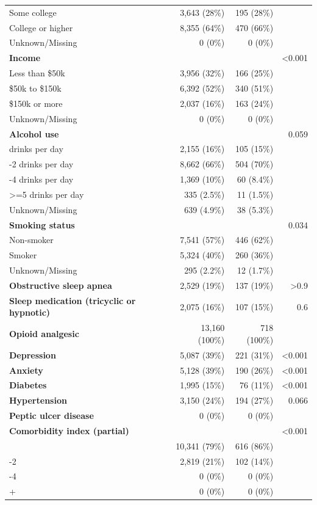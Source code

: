 \documentclass[11pt]{article}
\begin{document}
\begin{longtable}{@{}p{6.4cm}rrr@{}}
\quad Some college & 3,643 (28\%) & 195 (28\%) &  \\
\quad College or higher & 8,355 (64\%) & 470 (66\%) &  \\
\quad Unknown/Missing & 0 (0\%) & 0 (0\%) &  \\
\textbf{Income} &  &  & <0.001 \\
\quad Less than \$50k & 3,956 (32\%) & 166 (25\%) &  \\
\quad \$50k to \$150k & 6,392 (52\%) & 340 (51\%) &  \\
\quad \$150k or more & 2,037 (16\%) & 163 (24\%) &  \\
\quad Unknown/Missing & 0 (0\%) & 0 (0\%) &  \\
\textbf{Alcohol use} &  &  & 0.059 \\
\quad 0 drinks per day & 2,155 (16\%) & 105 (15\%) &  \\
\quad 1-2 drinks per day & 8,662 (66\%) & 504 (70\%) &  \\
\quad 3-4 drinks per day & 1,369 (10\%) & 60 (8.4\%) &  \\
\quad >=5 drinks per day & 335 (2.5\%) & 11 (1.5\%) &  \\
\quad Unknown/Missing & 639 (4.9\%) & 38 (5.3\%) &  \\
\textbf{Smoking status} &  &  & 0.034 \\
\quad Non-smoker & 7,541 (57\%) & 446 (62\%) &  \\
\quad Smoker & 5,324 (40\%) & 260 (36\%) &  \\
\quad Unknown/Missing & 295 (2.2\%) & 12 (1.7\%) &  \\
\textbf{Obstructive sleep apnea} & 2,529 (19\%) & 137 (19\%) & >0.9 \\
\textbf{Sleep medication (tricyclic or hypnotic)} & 2,075 (16\%) & 107 (15\%) & 0.6 \\
\textbf{Opioid analgesic} & 13,160 (100\%) & 718 (100\%) &  \\
\textbf{Depression} & 5,087 (39\%) & 221 (31\%) & <0.001 \\
\textbf{Anxiety} & 5,128 (39\%) & 190 (26\%) & <0.001 \\
\textbf{Diabetes} & 1,995 (15\%) & 76 (11\%) & <0.001 \\
\textbf{Hypertension} & 3,150 (24\%) & 194 (27\%) & 0.066 \\
\textbf{Peptic ulcer disease} & 0 (0\%) & 0 (0\%) &  \\
\textbf{Comorbidity index (partial)} &  &  & <0.001 \\
\quad 0 & 10,341 (79\%) & 616 (86\%) &  \\
\quad 1-2 & 2,819 (21\%) & 102 (14\%) &  \\
\quad 3-4 & 0 (0\%) & 0 (0\%) &  \\
\quad 5+ & 0 (0\%) & 0 (0\%) &  \\
\bottomrule \end{longtable}\normalsize
\end{document}
